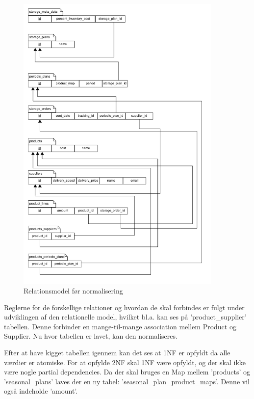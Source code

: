 \begin{figure}[H]
    \centering
    \includegraphics[width=0.9\textwidth]{figures/krav/relation_model_0th_normalization}
    \caption{Relationsmodel før normalisering}
    \label{fig:relational_model_0}
\end{figure}

Reglerne for de forskellige relationer og hvordan de skal forbindes er fulgt under udviklingen af den relationelle model, hvilket bl.a. kan ses på 'product\_supplier' tabellen. Denne forbinder en mange-til-mange association mellem Product og Supplier. 
Nu hvor tabellen er lavet, kan den normaliseres.

Efter at have kigget tabellen igennem kan det ses at 1NF er opfyldt da alle værdier er atomiske.
For at opfylde 2NF skal 1NF være opfyldt, og der skal ikke være nogle partial dependencies. Da der skal bruges en Map mellem 'products' og 'seasonal\_plans' laves der en ny tabel: 'seasonal\_plan\_product\_maps'. Denne vil også indeholde 'amount'.

